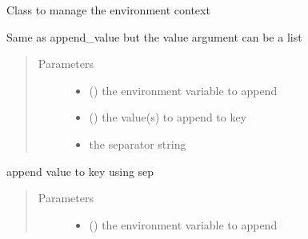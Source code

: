 \documentclass[a4paper,10pt,english]{sphinxmanual}
\begin{document}
\begin{fulllineitems}
\label{\detokenize{commands/apidoc/src:src.environment.Environ}}
Class to manage the environment context

\begin{fulllineitems}
\label{\detokenize{commands/apidoc/src:src.environment.Environ.append}}
Same as append\_value but the value argument can be a list
\begin{quote}\begin{description}
\item[{Parameters}] \leavevmode\begin{itemize}
\item {} 
 () \textendash{} the environment variable to append

\item {} 
 () \textendash{} the value(s) to append to key

\item {} 
 \textendash{} the separator string

\end{itemize}

\end{description}\end{quote}

\end{fulllineitems}


\begin{fulllineitems}
\label{\detokenize{commands/apidoc/src:src.environment.Environ.append_value}}
append value to key using sep
\begin{quote}\begin{description}
\item[{Parameters}] \leavevmode\begin{itemize}
\item {} 
 () \textendash{} the environment variable to append


\end{itemize}
\end{description}
\end{quote}
\end{fulllineitems}
\end{fulllineitems}
\end{document}
